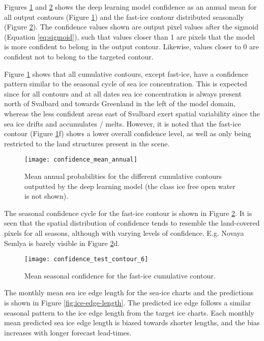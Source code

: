 \documentclass[../main/thesis.tex]{subfiles}
\begin{document}
Figures \ref{fig:mean_annual_confidence} and \ref{fig:confidence_seasonal} shows the deep learning model confidence as an annual mean for all output contours (Figure \ref{fig:mean_annual_confidence}) and the fast-ice contour distributed seasonally (Figure \ref{fig:confidence_seasonal}). The confidence values shown are output pixel values after the sigmoid (Equation \ref{eq:sigmoid}), such that values closer than 1 are pixels that the model is more confident to belong in the output contour. Likewise, values closer to 0 are confident not to belong to the targeted contour.

Figure \ref{fig:mean_annual_confidence} shows that all cumulative contours, except fast-ice, have a confidence pattern similar to the seasonal cycle of sea ice concentration. This is expected since for all contours and at all dates sea ice concentration is always present north of Svalbard and towards Greenland in the left of the model domain, whereas the less confident areas east of Svalbard exert spatial variability since the sea ice drifts and accumulates / melts. However, it is noted that the fast-ice contour (Figure \ref{fig:mean_annual_confidence}f) shows a lower overall confidence level, as well as only being restricted to the land structures present in the scene.

\begin{figure}
    \centering
    \texttt{[image: confidence\_mean\_annual]}
    \caption{\label{fig:mean_annual_confidence}Mean annual probabilities for the different cumulative contours outputted by the deep learning model (the class ice free open water is not shown).}
\end{figure}

The seasonal confidence cycle for the fast-ice contour is shown in Figure \ref{fig:confidence_seasonal}. It is seen that the spatial distribution of confidence tends to resemble the land-covered pixels for all seasons, although with varying levels of confidence. E.g. Novaya Semlya is barely visible in Figure \ref{fig:confidence_seasonal}d.

\begin{figure}
    \centering
    \texttt{[image: confidence\_test\_contour\_6]}
    \caption{\label{fig:confidence_seasonal}Mean seasonal confidence for the fast-ice cumulative contour.}
\end{figure}

The monthly mean sea ice edge length for the sea-ice charts and the predictions is shown in Figure \ref{fig:ice-edge-length}. The predicted ice edge follows a similar seasonal pattern to the ice edge length from the target ice charts. Each monthly mean predicted sea ice edge length is biased towards shorter lengths, and the bias increases with longer forecast lead-times.
\end{document}
